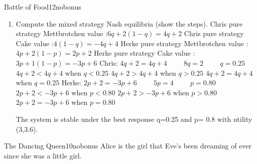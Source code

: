 \documentclass[twoside,english,colorbacktitle,accentcolor=tud9c,10pt]{tudexercise}
\begin{document}
\begin{questions}
\begin{question}{Battle of Food}{12}{nobonus}
\begin{enumerate}
		\item Compute the mixed strategy Nash equilibria (show the steps).
		\newline
		\newline
		Chris pure strategy Mettbrotchen value :$6q+2(1-q)=4q+2$
		\newline
		Chris pure strategy Cake value :$4(1-q)=-4q+4$
		\newline
		Herke pure strategy Mettbrotchen value :$4p+2(1-p)=2p+2$
		\newline
		Herke pure strategy Cake value :$3p+1(1-p)=-3p+6$
		\newline
		\newline
		Chris:
		\newline
		$4q+2=4q+4\hspace{1cm}8q=2\hspace{1cm}q=0.25$
		\newline
		$4q+2<4q+4$ when $q<0.25$
		\newline
		$4q+2>4q+4$ when $q>0.25$
		\newline
		$4q+2=4q+4$ when $q=0.25$
		\newline
		\newline
		Herke:
		\newline
		$2p+2=-3p+6\hspace{1cm}5p=4\hspace{1cm}p=0.80$
		\newline
		$2p+2<-3p+6$ when $p<0.80$
		\newline
		$2p+2>-3p+6$ when $p>0.80$
		\newline
		$2p+2=-3p+6$ when $p=0.80$
		\newline

		The system is stable under the best response q=0.25 and p= 0.8 with utility (3,3.6).
		\newline
	\end{enumerate}
\end{question}

\begin{question}{The Dancing Queen}{10}{nobonus}
	\eighthnote Alice is the girl that Eve's been dreaming of ever since she was a little girl. \twonotes
	

\end{question}
\end{questions}
\end{document}
